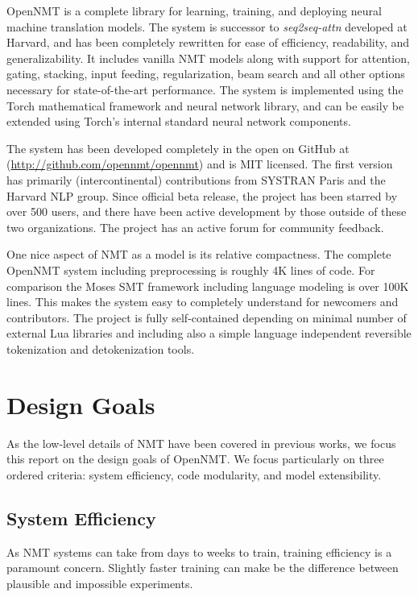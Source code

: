 \documentclass[11pt]{article}
\begin{document}
OpenNMT is a complete library for learning, training, and
deploying neural machine translation models. The system is successor
to  \textit{seq2seq-attn} developed at Harvard, and has been completely rewritten for ease of efficiency, readability, and generalizability. It includes 
vanilla NMT models along with support for attention, gating, stacking,
input feeding, regularization, beam search and all other options necessary
for state-of-the-art performance.  
The system is implemented using the Torch mathematical framework and
neural network library, and can be easily be extended using Torch's
internal standard neural network components. 

The system has been developed completely in the open on GitHub at
(\url{http://github.com/opennmt/opennmt}) and is MIT licensed.  The
first version has primarily (intercontinental) contributions from
SYSTRAN Paris and the Harvard NLP group. Since official beta release,
the project has been starred by over 500 users, and there have been
active development by those outside of these two organizations. The
project has an active forum for community feedback.


One nice aspect of NMT as a model is its relative compactness. The
complete OpenNMT system including preprocessing is roughly 4K lines of
code. For comparison the Moses SMT framework including language
modeling is over 100K lines. This makes the system easy to completely
understand for newcomers and contributors. The project is fully self-contained
depending on minimal number of external Lua libraries and including also a simple
 language independent reversible tokenization and detokenization tools.



\section{Design Goals}


As the low-level details of NMT have been covered in previous
works, we focus this report on the design goals of
OpenNMT. We focus particularly on three ordered criteria:
system efficiency, code modularity, and model extensibility. 

\subsection{System Efficiency}

As NMT systems can take from days to weeks to train, training
efficiency is a paramount concern. Slightly faster training can make be the difference between
plausible and impossible experiments.
\end{document}
